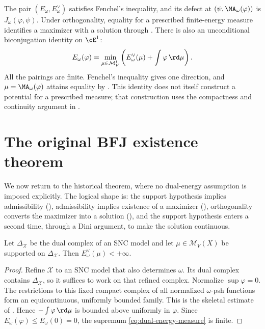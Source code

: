 \begin{remark}
\label{rem:ch28-fenchel-picture}
The pair $(E_\omega,E^\vee_\omega)$ satisfies Fenchel's inequality,
and its defect at $(\psi,\MA_\omega(\varphi))$ is
$J_\omega(\varphi,\psi)$.  Under orthogonality, equality for a prescribed
finite-energy measure identifies a maximizer with a solution through
.
There is also an unconditional biconjugation identity on $\cE^1$:
\[
 E_\omega(\varphi)=
 \min_{\mu\in\mathcal M^1_V}
       \left(E^\vee_\omega(\mu)+\int\varphi\,\rd\mu\right).
\]
All the pairings are finite.  Fenchel's inequality gives one direction,
and $\mu=\MA_\omega(\varphi)$ attains equality by
.  This identity does not itself
construct a potential for a prescribed measure; that construction uses
the compactness and continuity argument in
.
\end{remark}

\section{The original BFJ existence theorem}
\label{sec:ch28-bfj-theorem}

We now return to the historical theorem, where no dual-energy assumption is
imposed explicitly.  The logical shape is: the support hypothesis implies
admissibility (), admissibility implies
existence of a maximizer (),
orthogonality converts the maximizer into a solution
(), and the support hypothesis
enters a second time, through a Dini argument, to make the solution
continuous.

\begin{lemma}
\label{lem:skeletal-measure-finite-energy}
Let $\Delta_{\mathcal X}$ be the dual complex of an SNC model and let
$\mu\in\mathcal M_V(X)$ be supported on $\Delta_{\mathcal X}$.  Then
$E_\omega^\vee(\mu)<+\infty$.
\end{lemma}

\begin{proof}
Refine $\mathcal X$ to an SNC model that also determines $\omega$.
Its dual complex contains $\Delta_{\mathcal X}$, so it suffices to work
on that refined complex.  Normalize $\sup\varphi=0$.
The restrictions to this fixed compact complex of all normalized $\omega$-psh functions form an
equicontinuous, uniformly bounded family.  This is the skeletal estimate of
.  Hence
$-\int\varphi\,\rd \mu$ is bounded above uniformly in $\varphi$.  Since
$E_\omega(\varphi)\leq E_\omega(0)=0$, the supremum
\eqref{eq:dual-energy-measure} is finite.
\end{proof}

